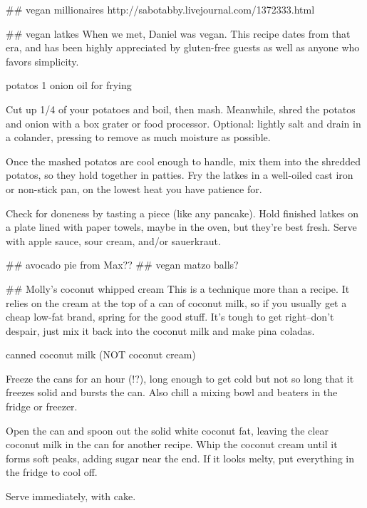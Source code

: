 ## vegan millionaires
http://sabotabby.livejournal.com/1372333.html

## vegan latkes
When we met, Daniel was vegan. This recipe dates from that era, and has been highly appreciated by gluten-free guests as well as anyone who favors simplicity.

potatos
1 onion
oil for frying

Cut up 1/4 of your potatoes and boil, then mash. Meanwhile, shred the potatos and onion with a box grater or food processor. Optional: lightly salt and drain in a colander, pressing to remove as much moisture as possible.

Once the mashed potatos are cool enough to handle, mix them into the shredded potatos, so they hold together in patties. Fry the latkes in a well-oiled cast iron or non-stick pan, on the lowest heat you have patience for.

Check for doneness by tasting a piece (like any pancake). Hold finished latkes on a plate lined with paper towels, maybe in the oven, but they're best fresh. Serve with apple sauce, sour cream, and/or sauerkraut.

## avocado pie from Max??
## vegan matzo balls?

## Molly's coconut whipped cream
This is a technique more than a recipe. It relies on the cream at the top of a can of coconut milk, so if you usually get a cheap low-fat brand, spring for the good stuff. It's tough to get right--don't despair, just mix it back into the coconut milk and make pina coladas.

canned coconut milk (NOT coconut cream)

Freeze the cans for an hour (!?), long enough to get cold but not so long that it freezes solid and bursts the can. Also chill a mixing bowl and beaters in the fridge or freezer.

Open the can and spoon out the solid white coconut fat, leaving the clear coconut milk in the can for another recipe. Whip the coconut cream until it forms soft peaks, adding sugar near the end. If it looks melty, put everything in the fridge to cool off.

Serve immediately, with cake.

